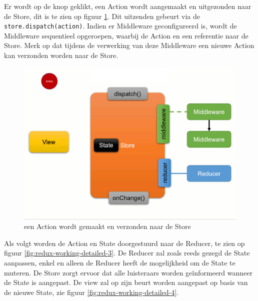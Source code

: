 Er wordt op de knop geklikt, een Action wordt aangemaakt en uitgezonden naar de Store, dit is te zien op figuur \ref{fig:redux-working-detailed-2}. Dit uitzenden gebeurt via de \verb|store.dispatch(action)|. Indien er Middleware geconfigureerd is, wordt de Middleware sequentieel opgeroepen, waarbij de Action en een referentie naar de Store. Merk op dat tijdens de verwerking van deze Middleware een nieuwe Action kan verzonden worden naar de Store.

\begin{figure}[H]
    \centering
    \includegraphics[width=\figureWidthModifier\linewidth]{img/stand-van-zaken/redux-working-detailed-2.png}
    \caption{een Action wordt gemaakt en verzonden naar de Store}
    \label{fig:redux-working-detailed-2}
\end{figure}

Als volgt worden de Action en State doorgestuurd naar de Reducer, te zien op figuur \ref{fig:redux-working-detailed-3}. De Reducer zal zoals reeds gezegd de State aanpassen, enkel en alleen de Reducer heeft de mogelijkheid om de State te muteren. 
De Store zorgt ervoor dat alle luisteraars worden geïnformeerd wanneer de State is aangepast. De view zal op zijn beurt worden aangepast op basis van de nieuwe State, zie figuur \ref{fig:redux-working-detailed-4}.

